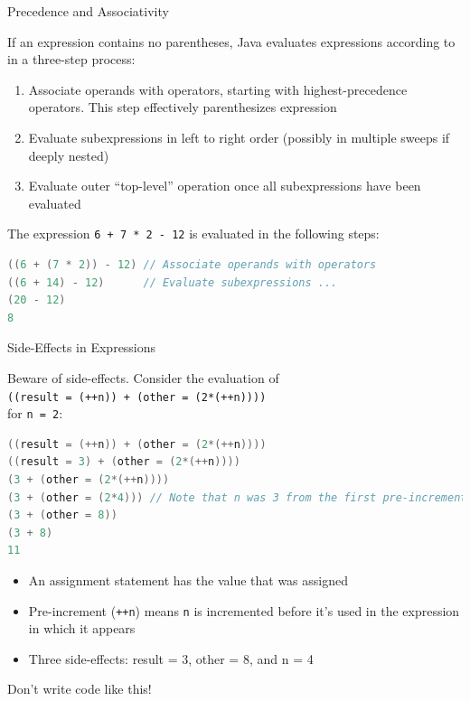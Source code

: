 \documentclass{beamer}
\begin{document}
\begin{frame}[fragile]{Precedence and Associativity}


If an expression contains no parentheses, Java evaluates expressions according to  in a three-step process:
\begin{enumerate}
\item Associate operands with operators, starting with highest-precedence operators.  This step effectively parenthesizes expression
\item Evaluate subexpressions in left to right order (possibly in multiple sweeps if deeply nested)
\item Evaluate outer ``top-level'' operation once all subexpressions have been evaluated
\end{enumerate}
The expression {\tt 6 + 7 * 2 - 12} is evaluated in the following steps:
\begin{lstlisting}[language=Java]
((6 + (7 * 2)) - 12) // Associate operands with operators
((6 + 14) - 12)      // Evaluate subexpressions ...
(20 - 12)
8
\end{lstlisting}


\end{frame}

\begin{frame}[fragile]{Side-Effects in Expressions}

Beware of side-effects.  Consider the evaluation of\\{\tt ((result = (++n)) + (other = (2*(++n))))}\\ for {\tt n = 2}:
\begin{lstlisting}[language=Java]
((result = (++n)) + (other = (2*(++n))))
((result = 3) + (other = (2*(++n))))
(3 + (other = (2*(++n))))
(3 + (other = (2*4))) // Note that n was 3 from the first pre-increment
(3 + (other = 8))
(3 + 8)
11
\end{lstlisting}
\vspace{-.05in}
\begin{itemize}
\item An assignment statement has the value that was assigned
\item Pre-increment ({\tt ++n}) means {\tt n} is incremented before it's used in the expression in which it appears
\item Three side-effects: result = 3, other = 8, and n = 4
\end{itemize}
Don't write code like this!
\end{frame}
\end{document}
